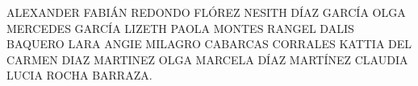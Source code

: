 ALEXANDER FABIÁN REDONDO FLÓREZ
NESITH DÍAZ GARCÍA
OLGA MERCEDES GARCÍA
LIZETH PAOLA MONTES RANGEL
DALIS BAQUERO LARA
ANGIE MILAGRO CABARCAS CORRALES
KATTIA DEL CARMEN DIAZ MARTINEZ
OLGA MARCELA DÍAZ MARTÍNEZ
CLAUDIA LUCIA ROCHA BARRAZA.